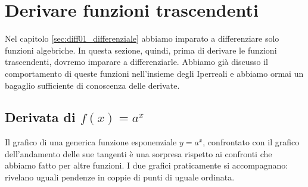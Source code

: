 \section{Derivare funzioni trascendenti}
\label{sec:diff01_deritrasc}
Nel capitolo \ref{sec:diff01_differenziale} abbiamo imparato a 
differenziare solo funzioni algebriche. In questa sezione, quindi, prima di
derivare le funzioni trascendenti, dovremo imparare a differenziarle.
Abbiamo già discusso il comportamento di queste funzioni nell'insieme degli
Iperreali e abbiamo ormai un bagaglio sufficiente di conoscenza delle derivate.
\subsection{Derivata di $f(x)=a^x$}
\label{}
Il grafico di una generica funzione esponenziale $y=a^x$, confrontato con 
il grafico dell'andamento delle sue tangenti è una sorpresa rispetto ai 
confronti
che abbiamo fatto per altre funzioni. I due grafici praticamente si 
accompagnano: 
rivelano uguali pendenze in coppie di punti di uguale ordinata.

\begin{inaccessibleblock}
  \begin{minipage}[]{.45\textwidth}
   \begin{center} \esp \end{center}
 \end{minipage} 
  \hfill
 \begin{minipage}[]{.42\textwidth}
   \begin{center} \tangentiesp \end{center}
 \end{minipage}
\end{inaccessibleblock}
\label{}

